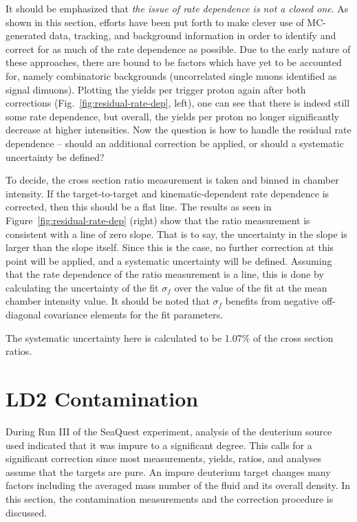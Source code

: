 It should be emphasized that \emph{the issue of rate dependence is not a closed one}. As shown in this section, efforts have been put forth to make clever use of MC-generated data, tracking, and background information in order to identify and correct for as much of the rate dependence as possible. Due to the early nature of these approaches, there are bound to be factors which have yet to be accounted for, namely combinatoric backgrounds (uncorrelated single muons identified as signal dimuons). Plotting the yields per trigger proton again after both corrections (Fig.~\ref{fig:residual-rate-dep}, left), one can see that there is indeed still some rate dependence, but overall, the yields per proton no longer significantly decrease at higher intensities. Now the question is how to handle the residual rate dependence -- should an additional correction be applied, or should a systematic uncertainty be defined?

To decide, the cross section ratio measurement is taken and binned in chamber intensity. If the target-to-target and kinematic-dependent rate dependence is corrected, then this should be a flat line. The results as seen in Figure~\ref{fig:residual-rate-dep} (right) show that the ratio measurement is consistent with a line of zero slope. That is to say, the uncertainty in the slope is larger than the slope itself. Since this is the case, no further correction at this point will be applied, and a systematic uncertainty will be defined. Assuming that the rate dependence of the ratio measurement is a line, this is done by calculating the uncertainty of the fit $\sigma_f$ over the value of the fit at the mean chamber intensity value. It should be noted that $\sigma_f$ benefits from negative off-diagonal covariance elements for the fit parameters.

The systematic uncertainty here is calculated to be 1.07\% of the cross section ratios.

\section{LD2 Contamination}\label{sec:contam}

During Run III of the SeaQuest experiment, analysis of the deuterium source used indicated that it was impure to a significant degree. This calls for a significant correction since most measurements, yields, ratios, and analyses assume that the targets are pure. An impure deuterium target changes many factors including the averaged mass number of the fluid and its overall density. In this section, the contamination measurements and the correction procedure is discussed.

